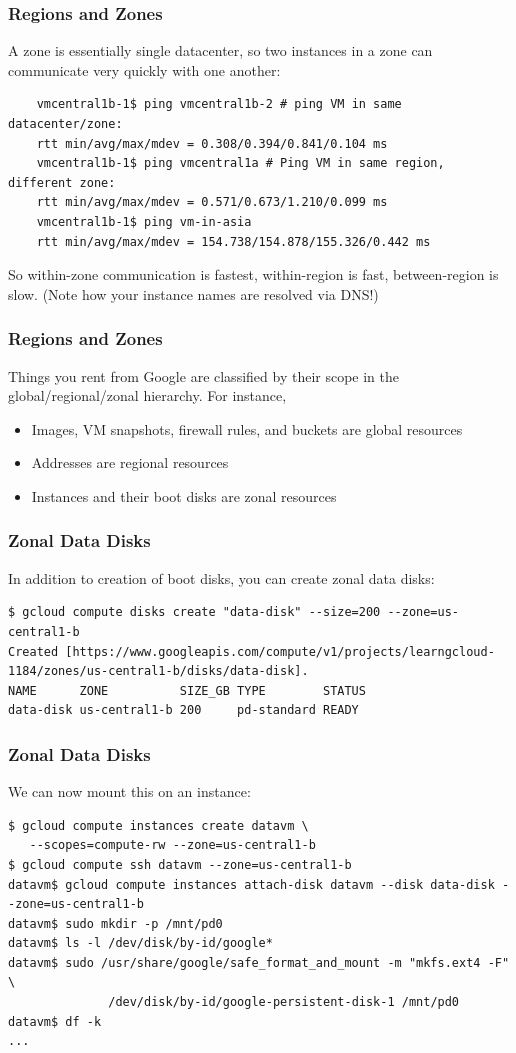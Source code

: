 \documentclass[9pt]{beamer}
\begin{document}
\begin{frame}[fragile]
  \frametitle{Regions and Zones}
  A zone is essentially single datacenter, so two instances in a zone can communicate very quickly with one another:
  \begin{verbatim}
    vmcentral1b-1$ ping vmcentral1b-2 # ping VM in same datacenter/zone:
    rtt min/avg/max/mdev = 0.308/0.394/0.841/0.104 ms
    vmcentral1b-1$ ping vmcentral1a # Ping VM in same region, different zone:
    rtt min/avg/max/mdev = 0.571/0.673/1.210/0.099 ms
    vmcentral1b-1$ ping vm-in-asia 
    rtt min/avg/max/mdev = 154.738/154.878/155.326/0.442 ms
  \end{verbatim}
  So within-zone communication is fastest, within-region is fast, between-region is slow. (Note how your instance names are resolved via DNS!)
\end{frame}

\begin{frame}[fragile]
\frametitle{Regions and Zones}
Things you rent from Google are classified by their scope in the global/regional/zonal hierarchy. For instance,
\begin{itemize}
	\item Images, VM snapshots, firewall rules, and buckets are global resources
	\item Addresses are regional resources
	\item Instances and their boot disks are zonal resources
\end{itemize}
\end{frame}

\begin{frame}[fragile]
\frametitle{Zonal Data Disks}
In addition to creation of boot disks, you can create zonal data disks:
\begin{verbatim}
$ gcloud compute disks create "data-disk" --size=200 --zone=us-central1-b
Created [https://www.googleapis.com/compute/v1/projects/learngcloud-1184/zones/us-central1-b/disks/data-disk].
NAME      ZONE          SIZE_GB TYPE        STATUS
data-disk us-central1-b 200     pd-standard READY
\end{verbatim}
\end{frame}

\begin{frame}[fragile]
\frametitle{Zonal Data Disks}
We can now mount this on an instance:
\begin{verbatim}
$ gcloud compute instances create datavm \
   --scopes=compute-rw --zone=us-central1-b
$ gcloud compute ssh datavm --zone=us-central1-b
datavm$ gcloud compute instances attach-disk datavm --disk data-disk --zone=us-central1-b
datavm$ sudo mkdir -p /mnt/pd0
datavm$ ls -l /dev/disk/by-id/google*	
datavm$ sudo /usr/share/google/safe_format_and_mount -m "mkfs.ext4 -F" \
              /dev/disk/by-id/google-persistent-disk-1 /mnt/pd0
datavm$ df -k
...
\end{verbatim}
\end{frame}
\end{document}
